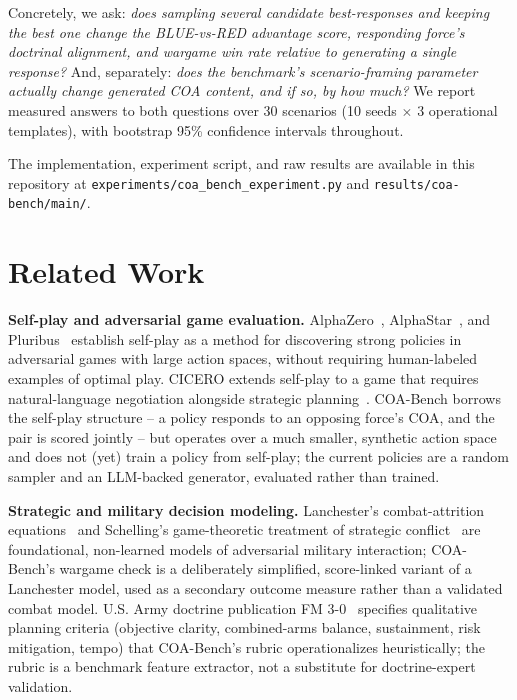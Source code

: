 \documentclass[sigconf]{acmart}
\begin{document}
Concretely, we ask: \emph{does sampling several candidate best-responses and keeping the best one change the BLUE-vs-RED advantage score, responding force's doctrinal alignment, and wargame win rate relative to generating a single response?} And, separately: \emph{does the benchmark's scenario-framing parameter actually change generated COA content, and if so, by how much?} We report measured answers to both questions over 30 scenarios (10 seeds $\times$ 3 operational templates), with bootstrap 95\% confidence intervals throughout.

The implementation, experiment script, and raw results are available in this repository at \texttt{experiments/coa\_bench\_experiment.py} and \texttt{results/coa-bench/main/}.

\section{Related Work}

\textbf{Self-play and adversarial game evaluation.} AlphaZero~\cite{silver2018alphazero}, AlphaStar~\cite{vinyals2019alphastar}, and Pluribus~\cite{brown2019superhuman} establish self-play as a method for discovering strong policies in adversarial games with large action spaces, without requiring human-labeled examples of optimal play. CICERO extends self-play to a game that requires natural-language negotiation alongside strategic planning~\cite{bakhtin2022cicero}. COA-Bench borrows the self-play structure -- a policy responds to an opposing force's COA, and the pair is scored jointly -- but operates over a much smaller, synthetic action space and does not (yet) train a policy from self-play; the current policies are a random sampler and an LLM-backed generator, evaluated rather than trained.

\textbf{Strategic and military decision modeling.} Lanchester's combat-attrition equations~\cite{lanchester1916} and Schelling's game-theoretic treatment of strategic conflict~\cite{schelling1960} are foundational, non-learned models of adversarial military interaction; COA-Bench's wargame check is a deliberately simplified, score-linked variant of a Lanchester model, used as a secondary outcome measure rather than a validated combat model. U.S. Army doctrine publication FM 3-0~\cite{fm30} specifies qualitative planning criteria (objective clarity, combined-arms balance, sustainment, risk mitigation, tempo) that COA-Bench's rubric operationalizes heuristically; the rubric is a benchmark feature extractor, not a substitute for doctrine-expert validation.
\end{document}
